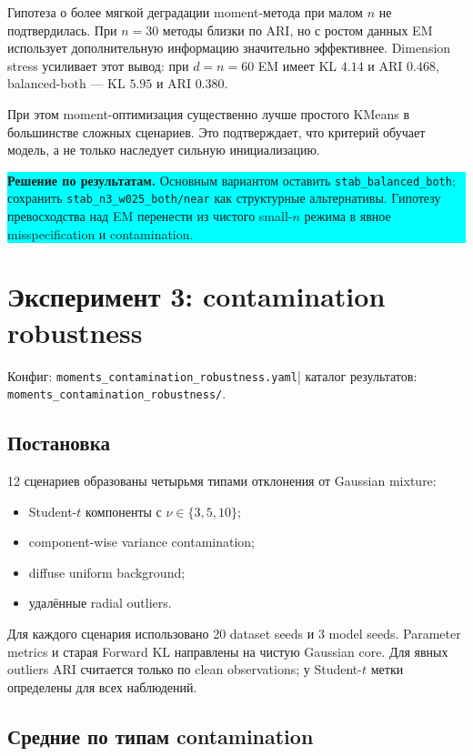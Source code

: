\documentclass[11pt,a4paper]{article}
\newcommand{\code}[1]{{\footnotesize\nolinkurl{#1}}}
\newcommand{\decision}[1]{%
  \begin{center}
  \colorbox{cyan}{\parbox{0.94\linewidth}{%
    \textbf{\sffamily\color{navy}Решение по результатам.} #1}}
  \end{center}
}
\newcommand{\configlink}[1]{%
  \code{#1.yaml}}
\newcommand{\resultslink}[1]{%
  \code{#1/}}
\newcommand{\runrefs}[1]{%
  \small\color{midgray}%
  Конфиг: \configlink{#1}\enspace|\enspace
  каталог результатов: \resultslink{#1}.%
  \normalsize\color{black}}
\begin{document}
Гипотеза о более мягкой деградации moment-метода при малом $n$ не
подтвердилась. При $n=30$ методы близки по ARI, но с ростом данных EM
использует дополнительную информацию значительно эффективнее. Dimension
stress усиливает этот вывод: при $d=n=60$ EM имеет KL $4.14$ и ARI $0.468$,
balanced-both --- KL $5.95$ и ARI $0.380$.

При этом moment-оптимизация существенно лучше простого KMeans в большинстве
сложных сценариев. Это подтверждает, что критерий обучает модель, а не только
наследует сильную инициализацию.

\decision{Основным вариантом оставить \code{stab_balanced_both}; сохранить
\code{stab_n3_w025_both/near} как структурные альтернативы. Гипотезу
превосходства над EM перенести из чистого small-$n$ режима в явное
misspecification и contamination.}

\section{Эксперимент 3: contamination robustness}

\runrefs{moments_contamination_robustness}

\subsection{Постановка}

12 сценариев образованы четырьмя типами отклонения от Gaussian mixture:

\begin{itemize}
  \item Student-$t$ компоненты с $\nu\in\{3,5,10\}$;
  \item component-wise variance contamination;
  \item diffuse uniform background;
  \item удалённые radial outliers.
\end{itemize}

Для каждого сценария использовано 20 dataset seeds и 3 model seeds.
Parameter metrics и старая Forward KL направлены на чистую Gaussian core.
Для явных outliers ARI считается только по clean observations; у Student-$t$
метки определены для всех наблюдений.

\subsection{Средние по типам contamination}
\end{document}
